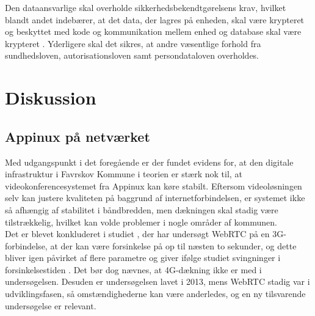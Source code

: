 Den dataansvarlige skal overholde sikkerhedsbekendtgørelsens krav, hvilket blandt andet indebærer, at det data, der lagres på enheden, skal være krypteret og beskyttet med kode og kommunikation mellem enhed og database skal være krypteret \cite{shbekendt}. Yderligere skal det sikres, at andre væsentlige forhold fra sundhedsloven, autorisationsloven samt persondataloven overholdes. 

\section{Diskussion}
\subsection{Appinux på netværket}
Med udgangspunkt i det foregående er der fundet evidens for, at den digitale infrastruktur i Favrskov Kommune i teorien er stærk nok til, at videokonferencesystemet fra Appinux kan køre stabilt. Eftersom videoløsningen selv kan justere kvaliteten på baggrund af internetforbindelsen, er systemet ikke så afhængig af stabilitet i båndbredden, men dækningen skal stadig være tilstrækkelig, hvilket kan volde problemer i nogle områder af kommunen.\\
Det er blevet konkluderet i studiet , der har undersøgt WebRTC på en 3G-forbindelse, at der kan være forsinkelse på op til næsten to sekunder, og dette bliver igen påvirket af flere parametre og giver ifølge studiet svingninger i forsinkelsestiden \cite{webrtcjournal}. Det bør dog nævnes, at 4G-dækning ikke er med i undersøgelsen. Desuden er undersøgelsen lavet i 2013, mens WebRTC stadig var i udviklingsfasen, så omstændighederne kan være anderledes, og en ny tilsvarende undersøgelse er relevant.


